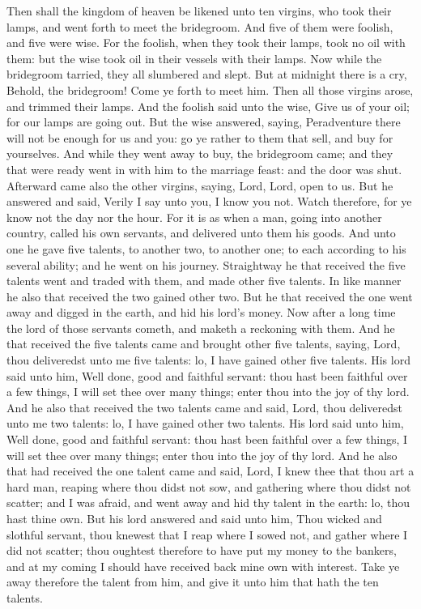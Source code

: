 Then shall the kingdom of heaven be likened unto ten virgins, who took their lamps, and went forth to meet the bridegroom. And five of them were foolish, and five were wise. For the foolish, when they took their lamps, took no oil with them: but the wise took oil in their vessels with their lamps. Now while the bridegroom tarried, they all slumbered and slept. But at midnight there is a cry, Behold, the bridegroom! Come ye forth to meet him. Then all those virgins arose, and trimmed their lamps. And the foolish said unto the wise, Give us of your oil; for our lamps are going out. But the wise answered, saying, Peradventure there will not be enough for us and you: go ye rather to them that sell, and buy for yourselves. And while they went away to buy, the bridegroom came; and they that were ready went in with him to the marriage feast: and the door was shut. Afterward came also the other virgins, saying, Lord, Lord, open to us. But he answered and said, Verily I say unto you, I know you not. Watch therefore, for ye know not the day nor the hour.  For it is as when a man, going into another country, called his own servants, and delivered unto them his goods. And unto one he gave five talents, to another two, to another one; to each according to his several ability; and he went on his journey. Straightway he that received the five talents went and traded with them, and made other five talents. In like manner he also that received the two gained other two. But he that received the one went away and digged in the earth, and hid his lord’s money. Now after a long time the lord of those servants cometh, and maketh a reckoning with them. And he that received the five talents came and brought other five talents, saying, Lord, thou deliveredst unto me five talents: lo, I have gained other five talents. His lord said unto him, Well done, good and faithful servant: thou hast been faithful over a few things, I will set thee over many things; enter thou into the joy of thy lord. And he also that received the two talents came and said, Lord, thou deliveredst unto me two talents: lo, I have gained other two talents. His lord said unto him, Well done, good and faithful servant: thou hast been faithful over a few things, I will set thee over many things; enter thou into the joy of thy lord. And he also that had received the one talent came and said, Lord, I knew thee that thou art a hard man, reaping where thou didst not sow, and gathering where thou didst not scatter; and I was afraid, and went away and hid thy talent in the earth: lo, thou hast thine own. But his lord answered and said unto him, Thou wicked and slothful servant, thou knewest that I reap where I sowed not, and gather where I did not scatter; thou oughtest therefore to have put my money to the bankers, and at my coming I should have received back mine own with interest. Take ye away therefore the talent from him, and give it unto him that hath the ten talents. 